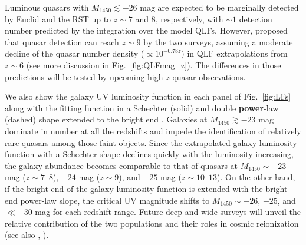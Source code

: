 \documentclass[twocolumn, twocolappendix]{aastex63}
\newcommand{\Muv}{M_{1450}}
\begin{document}
\begin{CJK*}{UTF8}{gbsn}
Luminous quasars with $\Muv \lesssim -26$ mag are expected to be marginally detected by Euclid and the RST up to $z\sim 7$ and 8, respectively,
with $\sim 1$ detection number predicted by the integration over the model QLFs.
However, \citet{2019BAAS...51c.121F} proposed that quasar detection can reach $z\sim 9$ by the two surveys,
assuming a moderate decline of the quasar number density ($\propto 10^{-0.78z}$) in QLF extrapolations from $z\sim 6$
(see more discussion in Fig.~\ref{fig:QLFmag_z}).
The differences in those predictions will be tested by upcoming high-$z$ quasar observations.



We also show the galaxy UV luminosity function in each panel of Fig.~\ref{fig:LFs}
along with the fitting function in a Schechter (solid) and double \textbf{power}-law (dashed) shape extended to the bright end
\citep{2013MNRAS.432.2696M, 2016ApJ...819..129O, 2018ApJ...867..150M, 2019ApJ...883...99S, 2020MNRAS.493.2059B,
2021AJ....162...47B, 2022arXiv220712356D,
2022ApJS..259...20H, Harikane_2022b, Harikane_2022c, 2022arXiv220709434N}.
Galaxies at $\Muv\gtrsim -23$ mag dominate in number at all the redshifts and impede
the identification of relatively rare quasars among those faint objects.
Since the extrapolated galaxy luminosity function with a Schechter shape declines quickly with the luminosity increasing,
the galaxy abundance becomes comparable to that of quasars at $\Muv \sim -23$ mag ($z\sim 7$--$8$), $-24$ mag ($z\sim 9$), and $-25$ mag ($z\sim 10$--$13$).
On the other hand, if the bright end of the galaxy luminosity function is extended with the bright-end power-law slope,
the critical UV magnitude shifts to $\Muv\sim-26$, $-25$, and $\ll -30$ mag for each redshift range.
Future deep and wide surveys will unveil the relative contribution of the two populations and their roles in cosmic reionization
(see also , \citealt{2022NatAs...6..850J}).




\end{CJK*}
\end{document}
